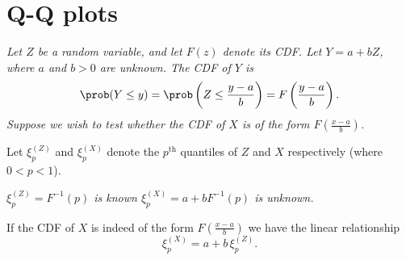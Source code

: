
\section{Q-Q plots}
\bit
\it Let $Z$ be a random variable, and let $F(z)$ denote its CDF.
\it Let $Y = a + bZ$, where $a$ and $b>0$ are unknown.
\eit
The CDF of $Y$ is 
\[
\prob(Y\leq y) 
	= \prob\left(Z\leq\frac{y-a}{b}\right) = F\left(\frac{y-a}{b}\right).
\]
\bit
\it Suppose we wish to test whether the CDF of $X$ is of the form $\displaystyle F\left(\frac{x-a}{b}\right)$.
\eit

%

Let $\xi_p^{(Z)}$ and $\xi_p^{(X)}$ denote the $p^{\text{th}}$ quantiles of $Z$ and $X$ respectively (where $0<p<1$).

\vspace*{2ex}
\bit
\it $\xi_p^{(Z)} = F^{-1}(p)$ is known
\it $\xi_p^{(X)} = a + bF^{-1}(p)$ is unknown.
\eit

\vspace*{2ex}
If the CDF of $X$ is indeed of the form $\displaystyle F\left(\frac{x-a}{b}\right)$ we have the linear relationship 
\[
\xi_p^{(X)} = a + b\,\xi_p^{(Z)}.
\]



